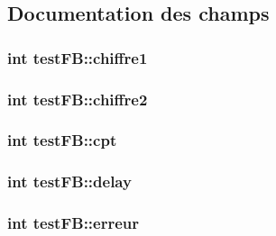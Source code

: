 \subsection{Documentation des champs}
\subsubsection[{\texorpdfstring{chiffre1}{chiffre1}}]{\setlength{\rightskip}{0pt plus 5cm}int test\+F\+B\+::chiffre1}\hypertarget{structtest_f_b_a356f4fce8c2f522fd08f4c45a5f59570}{}\label{structtest_f_b_a356f4fce8c2f522fd08f4c45a5f59570}
\subsubsection[{\texorpdfstring{chiffre2}{chiffre2}}]{\setlength{\rightskip}{0pt plus 5cm}int test\+F\+B\+::chiffre2}\hypertarget{structtest_f_b_a993aa24e718fb4568cd55d88feecb851}{}\label{structtest_f_b_a993aa24e718fb4568cd55d88feecb851}
\subsubsection[{\texorpdfstring{cpt}{cpt}}]{\setlength{\rightskip}{0pt plus 5cm}int test\+F\+B\+::cpt}\hypertarget{structtest_f_b_aa9a520b6a87fe214467f1ab30e4cab53}{}\label{structtest_f_b_aa9a520b6a87fe214467f1ab30e4cab53}
\subsubsection[{\texorpdfstring{delay}{delay}}]{\setlength{\rightskip}{0pt plus 5cm}int test\+F\+B\+::delay}\hypertarget{structtest_f_b_afce45aec2fc30e60d9261d5f5a3975d5}{}\label{structtest_f_b_afce45aec2fc30e60d9261d5f5a3975d5}
\subsubsection[{\texorpdfstring{erreur}{erreur}}]{\setlength{\rightskip}{0pt plus 5cm}int test\+F\+B\+::erreur}\hypertarget{structtest_f_b_ae27714bfada1c6176b1af512491dbd00}{}\label{structtest_f_b_ae27714bfada1c6176b1af512491dbd00}
